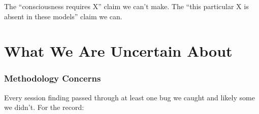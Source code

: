 \documentclass[11pt,a4paper]{article}
\begin{document}
The ``consciousness requires X'' claim we can't make. The ``this particular X is absent in these models'' claim we can.

\part{What We Are Uncertain About}

\section{Methodology Concerns}

Every session finding passed through at least one bug we caught and likely some we didn't. For the record:
\end{document}
